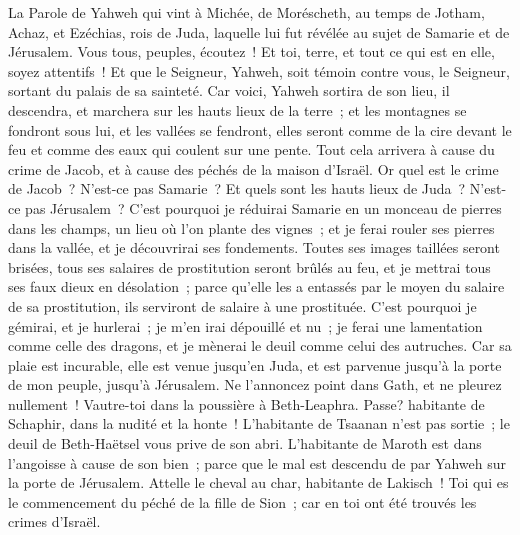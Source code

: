 \begin{multicols}{2}
\VerseOne{}La Parole de Yahweh qui vint à Michée, de Moréscheth, au temps de Jotham, Achaz, et Ezéchias, rois de Juda, laquelle  lui fut révélée au sujet de Samarie et de Jérusalem.
Vous tous, peuples, écoutez~! Et toi, terre, et tout ce qui est en elle, soyez attentifs~! Et que le Seigneur, Yahweh, soit témoin contre vous, le Seigneur, sortant du palais de sa sainteté.
Car voici, Yahweh sortira de son lieu, il descendra, et marchera sur les hauts lieux de la terre~;
et les montagnes se fondront sous lui, et les vallées se fendront, elles seront comme de la cire devant le feu et comme des eaux qui coulent sur une pente.
Tout cela arrivera à cause du crime de Jacob, et à cause des péchés de la maison d'Israël. Or quel est le crime de Jacob~? N'est-ce pas Samarie~? Et quels sont les hauts lieux de Juda~? N'est-ce pas Jérusalem~?
C'est pourquoi je réduirai Samarie en un monceau de pierres dans les champs, un lieu où l'on plante des vignes~; et je ferai rouler ses pierres dans la vallée, et je découvrirai ses fondements.
Toutes ses images taillées seront brisées, tous ses salaires de prostitution seront brûlés au feu, et je mettrai tous ses faux dieux en désolation~; parce qu'elle les a entassés par le moyen du salaire de sa prostitution, ils serviront de salaire à une prostituée.
C'est pourquoi je gémirai, et je hurlerai~; je m'en irai dépouillé et nu~; je ferai une lamentation comme celle des dragons, et je mènerai le deuil comme celui des autruches.
Car sa plaie est incurable, elle est venue jusqu'en Juda, et est parvenue jusqu'à la porte de mon peuple, jusqu'à Jérusalem.
Ne l'annoncez point dans Gath, et ne pleurez nullement~! Vautre-toi dans la poussière à Beth-Leaphra.
Passe? habitante de Schaphir, dans la nudité et la honte~! L'habitante de Tsaanan n'est pas sortie~; le deuil de Beth-Haëtsel vous prive de son abri.
L'habitante de Maroth est dans l'angoisse à cause de son bien~; parce que le mal est descendu de par Yahweh sur la porte de Jérusalem.
Attelle le cheval au char, habitante de Lakisch~! Toi qui es le commencement du péché de la fille de Sion~; car en toi ont été trouvés les crimes d'Israël.

\end{multicols}
